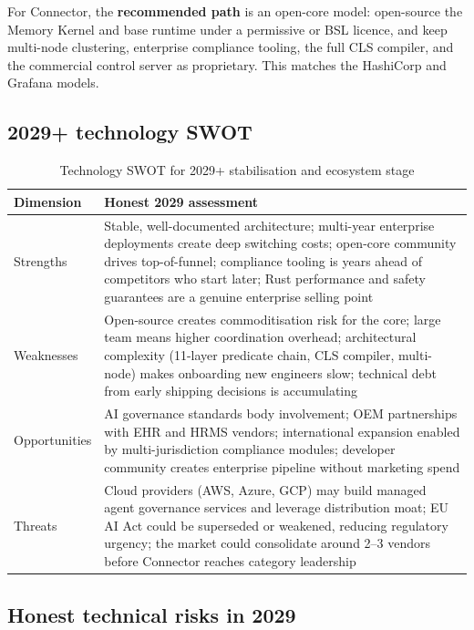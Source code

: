For Connector, the \textbf{recommended path} is an open-core model: open-source
the Memory Kernel and base runtime under a permissive or BSL licence, and keep
multi-node clustering, enterprise compliance tooling, the full CLS compiler,
and the commercial control server as proprietary. This matches the HashiCorp and
Grafana models.

\subsection{2029+ technology SWOT}

\begin{table}[H]
\centering
\renewcommand{\arraystretch}{1.45}
\begin{tabularx}{\textwidth}{@{}lX@{}}
\toprule
\textbf{Dimension} & \textbf{Honest 2029 assessment} \\
\midrule
Strengths & Stable, well-documented architecture; multi-year enterprise deployments create deep switching costs; open-core community drives top-of-funnel; compliance tooling is years ahead of competitors who start later; Rust performance and safety guarantees are a genuine enterprise selling point \\
Weaknesses & Open-source creates commoditisation risk for the core; large team means higher coordination overhead; architectural complexity (11-layer predicate chain, CLS compiler, multi-node) makes onboarding new engineers slow; technical debt from early shipping decisions is accumulating \\
Opportunities & AI governance standards body involvement; OEM partnerships with EHR and HRMS vendors; international expansion enabled by multi-jurisdiction compliance modules; developer community creates enterprise pipeline without marketing spend \\
Threats & Cloud providers (AWS, Azure, GCP) may build managed agent governance services and leverage distribution moat; EU AI Act could be superseded or weakened, reducing regulatory urgency; the market could consolidate around 2--3 vendors before Connector reaches category leadership \\
\bottomrule
\end{tabularx}
\caption{Technology SWOT for 2029+ stabilisation and ecosystem stage}
\end{table}

\subsection{Honest technical risks in 2029}


